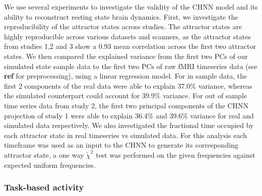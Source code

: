 \documentclass{article}
\begin{document}
We use several experiments to investigate the validity of the CHNN model and its ability to reconstruct resting state
brain dynamics. First, we investigate the reproducibility  of the attractor states across studies.
The attractor states are highly reproducible across various datasets and scanners, as the attractor states from studies
1,2 and 3 show a 0.93 mean correlation across the first two attractor states.
We then compared the explained variance from the first two PCs of our simulated state sample data to the first two PCs of
raw fMRI timeseries data (see \textbf{ref} for preprocessing), using a linear regression model.
For in sample data, the first 2 components of the real data
were able to explain 37.0\% variance, whereas the simulated counterpart could account for 39.9\% variance. For out of
sample time series data from study 2, the first two principal components of the CHNN projection of study 1 were
able to explain 36.4\% and 39.6\% variance for real and simulated data respectively.
We also investigated the fractional time occupied by each attractor state in real timeseries vs simulated data. For
this analysis each timeframe was used as an input to the CHNN to generate its corresponding attractor state, a one
way $\tilde{\chi}^2$ test was performed on the given frequencies against expected uniform frequencies.

\subsubsection{Task-based activity}\label{Task-based activity}
\end{document}
